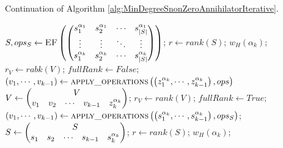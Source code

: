 \documentclass[11pt]{llncs}
\begin{document}
\begin{algorithm}
	\caption{Continuation of Algorithm \ref{alg:MinDegreeSnonZeroAnnihilatorIterative}.}\label{alg:continueationMinDegreeSnonZeroAnnihilatorIterative}
	\begin{algorithmic}
		\State $S, ops_S \gets \mbox{\textsc{EF}}\left(
		\begin{pmatrix}
		s_1^{\alpha_1} &  s_2^{\alpha_1} & \cdots & s_{|S|}^{\alpha_{1}}\\
		\vdots &  \vdots & \ddots & \vdots\\
		s_{1}^{\alpha_k} &  s_{2}^{\alpha_k} & \cdots & s_{|S|}^{\alpha_{k}}\\
		\end{pmatrix}\right)$;
		\State $r \gets rank(S)$;
		\State \Return $w_H\left(\alpha_k\right)$;
		\EndIf
		\State $r_V \gets rabk(V)$;
		\State $fullRank \gets False$;
		\State $\left(v_1, \cdots, v_{k-1}\right) \gets \mbox{\textsc{apply\_operations}}\left(\left(z_1^{\alpha_k}, \cdots, z_{k-1}^{\alpha_k}\right), ops\right)$ 
		\State $V \gets \begin{pmatrix}
			\multicolumn{5}{c}{\multirow{1}{*}{$V$}} \\
			v_1 & v_2 & \cdots & v_{k-1} & z_{k}^{\alpha_k}
		\end{pmatrix}$;
		\State $r_V \gets rank(V)$;
		\State $fullRank \gets True$;
		\EndIf
		\State $\left(v_1, \cdots, v_{k-1}\right) \gets \mbox{\textsc{apply\_operations}}\left(\left(s_1^{\alpha_k}, \cdots, s_{k-1}^{\alpha_k}\right), ops_S\right)$;
		\State $S \gets \begin{pmatrix}
		\multicolumn{5}{c}{\multirow{1}{*}{$S$}} \\
		s_1 & s_2 & \cdots & s_{k-1} & s_{k}^{\alpha_k}
		\end{pmatrix}$;
		\State $r \gets rank(S)$;
		\State \Return $w_H\left(\alpha_k\right)$;
		\EndIf
		\EndWhile
	\end{algorithmic}
\end{algorithm}
\end{document}
